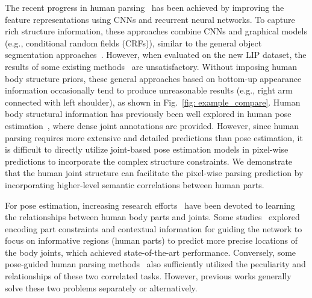 \documentclass[10pt,journal,compsoc]{IEEEtran}
\begin{document}
The recent progress in human parsing~\cite{chen2015attention,xia2015zoom,LinASPL,Yamaguchiparsing13,Dongparsing13,SimoSerraACCV2014,M-CNN,Co-CNN} has been achieved by improving the feature representations using CNNs and recurrent neural networks. To capture rich structure information, these approaches combine CNNs and graphical models (e.g., conditional random fields (CRFs)), similar to the general object segmentation approaches~\cite{crfasrnn,chen2014semantic,wang2015joint}. However, when evaluated on the new LIP dataset, the results of some existing methods~\cite{badrinarayanan2015segnet,long2014fully,chen2014semantic,chen2015attention} are unsatisfactory. Without imposing human body structure priors, these general approaches based on bottom-up appearance information occasionally tend to produce unreasonable results (e.g., right arm connected with left shoulder), as shown in Fig.~\ref{fig: example_compare}. Human body structural information has previously been well explored in human pose estimation~\cite{yang2016end,Chen_NIPS14}, where dense joint annotations are provided. However, since human parsing requires more extensive and detailed predictions than pose estimation, it is difficult to directly utilize joint-based pose estimation models in pixel-wise predictions to incorporate the complex structure constraints. We demonstrate that the human joint structure can facilitate the pixel-wise parsing prediction by incorporating higher-level semantic correlations between human parts.

For pose estimation, increasing research efforts~\cite{Chu_2017_CVPR,bulat2016human,dantone2013human,park2017attribute} have been devoted to learning the relationships between human body parts and joints. Some studies~\cite{Chu_2017_CVPR,bulat2016human} explored encoding part constraints and contextual information for guiding the network to focus on informative regions (human parts) to predict more precise locations of the body joints, which achieved state-of-the-art performance. Conversely, some pose-guided human parsing methods~\cite{dong2014towards,xia2016pose} also sufficiently utilized the peculiarity and relationships of these two correlated tasks. However, previous works generally solve these two problems separately or alternatively.
\end{document}
